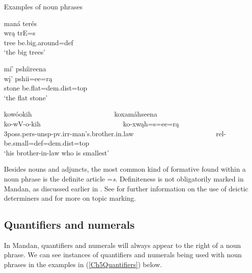 \begin{exe}

\item\label{NounExamples} Examples of noun phrases

\begin{xlist}

    \item\label{NounExamplesA} \glll maná terés\\
    wrą trE=s\\
    \textnormal{tree} \textnormal{be.big.around}=def\\
    \glt `the big trees' \citep[21]{hollow1973a}

    \item\label{NounExamplesB} \glll mí' pshíireena\\
    wį' pshii=ee=rą\\
    \textnormal{stone} \textnormal{be.flat}=dem.dist=top\\
    \glt `the flat stone' \citep[316]{hollow1973b}

    \item\label{NounExamplesC} \glll kowóokih ~ ~ ~ ~ ~ ~ ~ ~ ~ ~ ~ ~ ~ ~ koxamáhseena\\
    ko-wV-o-kih ~ ~ ~ ~ ~ ~ ~ ~ ~ ~ ~ ~ ~ ~ ko-xwąh=s=ee=rą\\
    3poss.pers-unsp-pv.irr-\textnormal{man's.brother.in.law} ~ ~ ~ ~ ~ ~ ~ ~ ~ ~ ~ ~ ~ ~ rel-\textnormal{be.small}=def=dem.dist=top\\
    \glt `his brother-in-law who is smallest' \citep[133]{hollow1973a}
    
\end{xlist}

\end{exe}

Besides nouns and adjuncts, the most common kind of formative found within a noun phrase is the definite article =\textit{s}. Definiteness is not obligatorily marked in Mandan, as discussed earlier in . See  for further information on the use of deictic determiners and  for more on topic marking.

\subsection{Quantifiers and numerals}

In Mandan, quantifiers and numerals will always appear to the right of a noun phrase. We can see instances of quantifiers and numerals being used with noun phrases in the examples in (\ref{Ch5Quantifiers}) below.

